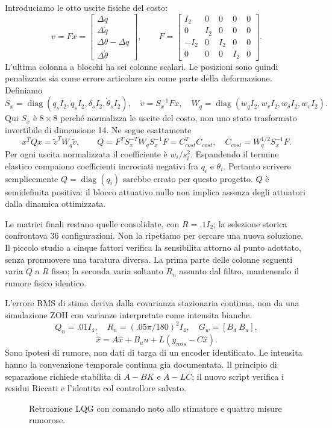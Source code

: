 \documentclass[11pt,a4paper,oneside]{report}
\newcommand{\schema}[2]{\begin{figure}[htbp]\centering\resizebox{.95\linewidth}{!}{}\caption{#2}\end{figure}}
\begin{document}
Introduciamo le otto uscite fisiche del costo:
\[
v=Fx=\begin{bmatrix}\Delta q\\\Delta\dot q\\
\Delta\theta-\Delta q\\\Delta\dot\theta\end{bmatrix},\qquad
F=\begin{bmatrix}
I_2&0&0&0&0\\0&I_2&0&0&0\\-I_2&0&I_2&0&0\\0&0&0&I_2&0
\end{bmatrix}.
\]
L'ultima colonna a blocchi ha sei colonne scalari. Le posizioni sono quindi
penalizzate sia come errore articolare sia come parte della deformazione.
Definiamo
\[
S_x=\operatorname{diag}(q_sI_2,\dot q_sI_2,\delta_sI_2,\dot\theta_sI_2),
\quad \tilde v=S_x^{-1}Fx,\quad
W_q=\operatorname{diag}(w_qI_2,w_vI_2,w_\delta I_2,w_vI_2).
\]
Qui $S_x$ è $8\times8$ perché normalizza le uscite del costo, non uno stato
trasformato invertibile di dimensione 14. Ne segue esattamente
\[
x^TQx=\tilde v^TW_q\tilde v,\qquad
Q=F^TS_x^{-T}W_qS_x^{-1}F=C_{cost}^TC_{cost},\quad
C_{cost}=W_q^{1/2}S_x^{-1}F.
\]
Per ogni uscita normalizzata il coefficiente è $w_i/s_i^2$.
Espandendo il termine elastico compaiono coefficienti incrociati negativi fra
$q_i$ e $\theta_i$. Pertanto scrivere semplicemente $Q=\operatorname{diag}(q_i)$
sarebbe errato per questo progetto. $Q$ è semidefinita positiva: il blocco
attuativo nullo non implica assenza degli attuatori dalla dinamica ottimizzata.


Le matrici finali restano quelle consolidate, con $R=.1I_2$;
la selezione storica confrontava 36 configurazioni. Non la ripetiamo per
cercare una nuova soluzione. Il piccolo studio a cinque fattori verifica
la sensibilita attorno al punto adottato, senza promuovere una taratura diversa.
La prima parte delle colonne seguenti varia $Q$ a $R$ fisso; la seconda
varia soltanto $R_n$ assunto dal filtro, mantenendo il rumore fisico identico.

L'errore RMS di stima deriva dalla covarianza stazionaria continua, non
da una simulazione ZOH con varianze interpretate come intensita bianche.
\[
Q_n=.01I_4,\quad R_n=(.05\pi/180)^2I_4,\quad G_w=[B_d\ B_u],
\]
\[
\dot{\hat x}=A\hat x+B_uu+L(y_{mis}-C\hat x).
\]
Sono ipotesi di rumore, non dati di targa di un encoder identificato.
Le intensita hanno la convenzione temporale continua gia documentata.
Il principio di separazione richiede stabilita di $A-BK$ e $A-LC$;
il nuovo script verifica i residui Riccati e l'identita col controllore salvato.
\schema{lqg}{Retroazione LQG con comando noto allo stimatore e quattro misure rumorose.}
\end{document}
